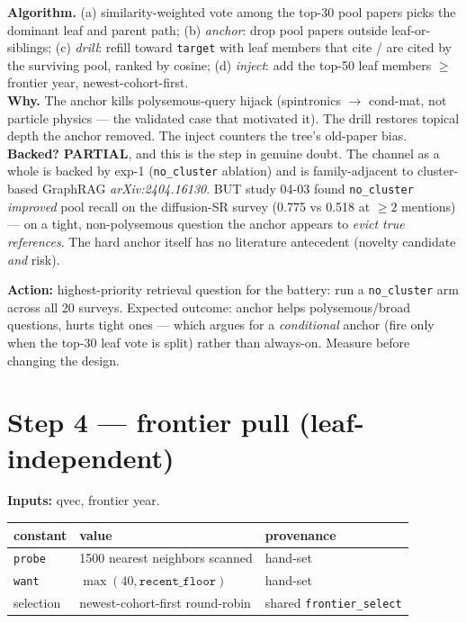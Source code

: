 \documentclass[10pt]{article}
\newenvironment{varbox}
  {\par\medskip\begin{lrbox}{\varboxsave}%
   \begin{minipage}{\dimexpr\linewidth-2\fboxsep\relax}\small\vspace{4pt}}
  {\vspace{4pt}\end{minipage}\end{lrbox}%
   \noindent\colorbox{boxbg}{\usebox{\varboxsave}}\par\medskip}
\newcommand{\backedpart}{\textcolor{orange!80!black}{\textbf{PARTIAL}}}
\newcommand{\lit}[1]{\textcolor{blue!60!black}{\textit{#1}}}
\newcommand{\act}[1]{\par\smallskip\noindent\textbf{Action:} #1}
\begin{document}
\textbf{Algorithm.} (a) similarity-weighted vote among the top-30 pool papers picks the
dominant leaf and parent path; (b) \emph{anchor}: drop pool papers outside
leaf-or-siblings; (c) \emph{drill}: refill toward \texttt{target} with leaf members that
cite / are cited by the surviving pool, ranked by cosine; (d) \emph{inject}: add the top-50
leaf members $\geq$ frontier year, newest-cohort-first. \\
\textbf{Why.} The anchor kills polysemous-query hijack (spintronics $\to$ cond-mat, not
particle physics --- the validated case that motivated it). The drill restores topical depth
the anchor removed. The inject counters the tree's old-paper bias. \\
\textbf{Backed?} \backedpart, and this is the step in genuine doubt. The channel as a whole
is backed by exp-1 (\texttt{no\_cluster} ablation) and is family-adjacent to cluster-based
GraphRAG \lit{arXiv:2404.16130}. BUT study 04-03 found \texttt{no\_cluster} \emph{improved}
pool recall on the diffusion-SR survey (0.775 vs 0.518 at ${\geq}2$ mentions) --- on a
tight, non-polysemous question the anchor appears to \emph{evict true references}. The hard
anchor itself has no literature antecedent (novelty candidate \emph{and} risk). \\
\act{highest-priority retrieval question for the battery: run a \texttt{no\_cluster} arm
across all 20 surveys. Expected outcome: anchor helps polysemous/broad questions, hurts
tight ones --- which argues for a \emph{conditional} anchor (fire only when the top-30 leaf
vote is split) rather than always-on. Measure before changing the design.}

\section{Step 4 --- frontier pull (leaf-independent)}
\textbf{Inputs:} qvec, frontier year.

\begin{varbox}
\begin{tabular}{@{}lll@{}}
\toprule
constant & value & provenance \\
\midrule
\texttt{probe} & 1500 nearest neighbors scanned & hand-set \\
\texttt{want} & $\max(40, \texttt{recent\_floor})$ & hand-set \\
selection & newest-cohort-first round-robin & shared \texttt{frontier\_select} \\
\bottomrule
\end{tabular}
\end{varbox}
\end{document}

